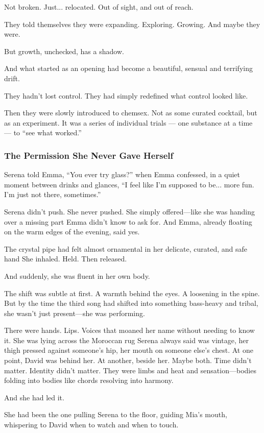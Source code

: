Not broken.
Just... relocated.
Out of sight, and out of reach.

They told themselves they were expanding. Exploring. Growing.
And maybe they were.

But growth, unchecked, has a shadow.

And what started as an opening had become a beautiful, sensual and terrifying drift.

They hadn’t lost control.
They had simply redefined what control looked like.

Then they were slowly introduced to chemsex. Not as some curated cocktail, but as an experiment. 
It was a series of individual trials --- one substance at a time --- to ``see what worked.'' 

\subsubsection{The Permission She Never Gave Herself}

Serena told Emma, “You ever try glass?” when Emma confessed, in a quiet moment between drinks and glances,
“I feel like I’m supposed to be... more fun. I’m just not there, sometimes.”

Serena didn’t push. She never pushed. She simply offered—like she was handing over a missing part Emma 
didn’t know to ask for.  And Emma, already floating on the warm edges of the evening, said yes.

The crystal pipe had felt almost ornamental in her delicate, curated, and safe hand
She inhaled. Held. Then released.

And suddenly, she was fluent in her own body.

The shift was subtle at first. A warmth behind the eyes. A loosening in the spine. But by the time the 
third song had shifted into something bass-heavy and tribal, she wasn’t just present—she was performing.

There were hands. Lips. Voices that moaned her name without needing to know it.
She was lying across the Moroccan rug Serena always said was vintage, her thigh pressed against someone’s 
hip, her mouth on someone else’s chest. At one point, David was behind her. At another, beside her. Maybe 
both. Time didn’t matter. Identity didn’t matter. They were limbs and heat and sensation—bodies folding 
into bodies like chords resolving into harmony.

And she had led it.

She had been the one pulling Serena to the floor, guiding Mia’s mouth, whispering to David when to watch 
and when to touch.

